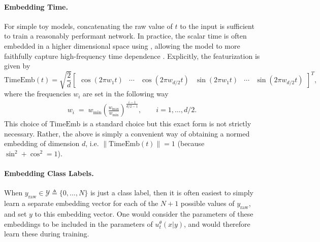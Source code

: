 \paragraph{Embedding Time.} For simple toy models, concatenating the raw value of $t$ to the input is sufficient to train a reasonably performant network. In practice, the scalar time is often embedded in a higher dimensional space using , allowing the model to more faithfully capture high-frequency time dependence \citep{tancik2020fourierfeaturesletnetworks}. Explicitly, the featurization is given by
\begin{equation}
    \text{TimeEmb}(t) = \sqrt{\frac{2}{d}}\begin{bmatrix}
    \cos(2\pi w_1 t) & \cdots & \cos(2\pi w_{d/2} t) & \sin(2\pi w_1 t) & \cdots & \sin(2\pi w_{d/2} t)
    \end{bmatrix}^T,
\end{equation}
where the frequencies $w_i$ are set in the following way
\begin{align}
w_i \;=\; w_{\min}\left(\frac{w_{\max}}{w_{\min}}\right)^{\frac{i-1}{d/2-1}},
\qquad i=1,\ldots,d/2.
\end{align}
This choice of $\text{TimeEmb}$ is a standard choice but this exact form is not strictly necessary. Rather, the above is simply a convenient way of obtaining a normed embedding of dimension $d$, i.e. $\|\text{TimeEmb}(t)\|=1$ (because $\sin^2+\cos^2=1$).

\paragraph{Embedding Class Labels.}  When $y_{\text{raw}} \in \mathcal{Y} \triangleq \{0,\dots, N\}$ is just a class label, then it is often easiest to simply learn a separate embedding vector for each of the $N+1$ possible values of $y_{\text{raw}}$, and set $y$ to this embedding vector. One would consider the parameters of these embeddings to be included in the parameters of $u_t^\theta(x|y)$, and would therefore learn these during training.

